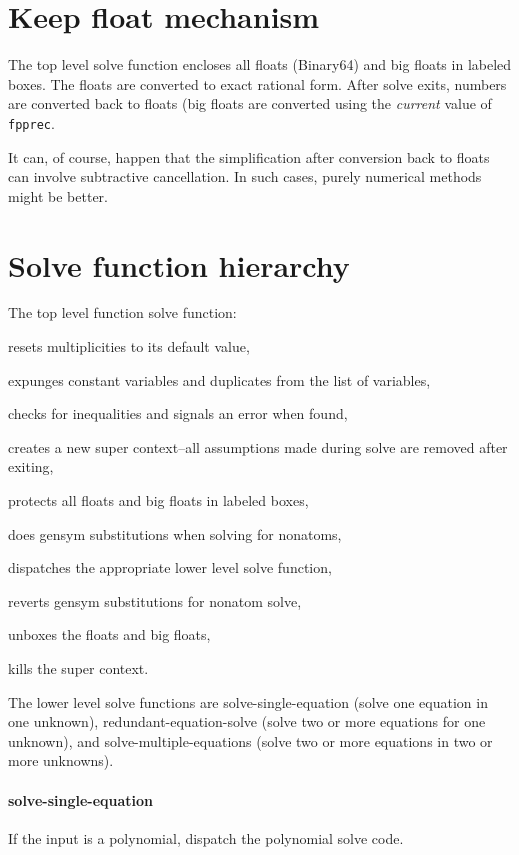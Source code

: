 \documentclass[]{scrartcl}
\newcommand{\fpprec}{\texttt{fpprec}}
\begin{document}
\section{Keep float mechanism}

The top level solve function encloses all floats (Binary64) and big floats in labeled boxes. The floats are converted to exact rational form.
After solve exits, numbers are converted back to floats (big floats are converted using the \emph{current} value of \fpprec.

It can, of course, happen that the simplification after conversion back to floats can involve subtractive cancellation. In such cases, purely numerical methods might be better.

\section{Solve function hierarchy}

 The top level function solve function:
 \begin{alphalist}[]
   \item resets multiplicities to its default value,
   \item expunges constant variables and duplicates from the list of variables,
   \item checks for inequalities and signals an error when found,
   \item creates a new super context--all assumptions made during solve are removed after exiting,
   \item protects all floats and big floats in labeled boxes,
   \item does gensym substitutions when solving for nonatoms,
   \item dispatches the appropriate lower level solve function,
   \item reverts gensym substitutions for nonatom solve,
   \item unboxes the floats and big floats,
   \item kills the super context.
\end{alphalist}

The lower level solve functions are solve-single-equation (solve one equation in one unknown), redundant-equation-solve (solve two or more equations for one unknown), and solve-multiple-equations (solve two or more equations in two or more unknowns).

\paragraph{solve-single-equation} If the input is a polynomial, dispatch the polynomial solve code.
\end{document}
